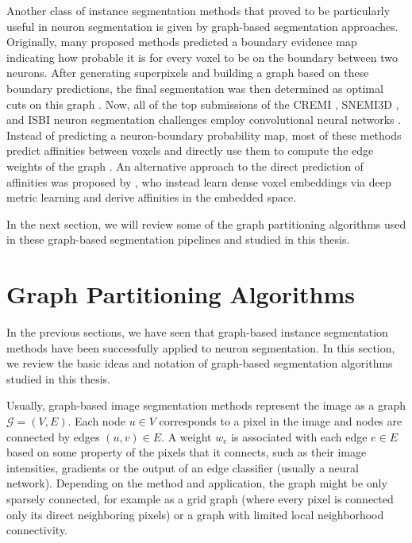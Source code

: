 Another class of instance segmentation methods that proved to be particularly useful in neuron segmentation is given by graph-based segmentation approaches. 
Originally, many proposed methods predicted a boundary evidence map indicating how probable it is for every voxel to be on the boundary between two neurons. After generating superpixels and building a graph based on these boundary predictions, the final segmentation was then determined as optimal cuts on this graph \cite{andres20123d,andres2012globally,beier2017multicut,funke2018large,meirovitch2019cross,turaga2010convolutional}. Now, all of the top submissions of the CREMI \cite{cremi}, SNEMI3D \cite{SNEMI3D}, and ISBI neuron segmentation challenges employ convolutional neural networks \cite{lee2017superhuman,hirsch2020patchperpix,bailoni2019generalized}. Instead of predicting a neuron-boundary probability map, most of these methods predict affinities between voxels and directly use them to compute the edge weights of the graph \cite{lee2017superhuman,pape2017solving,hirsch2020patchperpix,pape2019leveraging,wolf2018mutex}. An alternative approach to the direct prediction of affinities was proposed by \cite{lee2019learning}, who instead learn dense voxel embeddings via deep metric learning and derive affinities in the embedded space. 

In the next section, we will review some of the graph partitioning algorithms used in these graph-based segmentation pipelines and studied in this thesis.


\section{Graph Partitioning Algorithms}\label{sec:graph_partitioning_intro}
In the previous sections, we have seen that graph-based instance segmentation methods have been successfully applied to neuron segmentation. In this section, we review the basic ideas and notation of graph-based segmentation algorithms studied in this thesis.

Usually, graph-based image segmentation methods represent the image as a graph $\mathcal{G}=(V,E)$. Each node $u\in V$ corresponds to a pixel in the image and nodes are connected by edges $(u,v)\in E$. A weight $w_e$ is associated with each edge $e \in E$ based on some property of the pixels that it connects, such as their image intensities, gradients or the output of an edge classifier (usually a neural network). Depending on the method and application, the graph might be only sparsely connected, for example as a grid graph (where every pixel is connected only its direct neighboring pixels) or a graph with limited local neighborhood connectivity.

